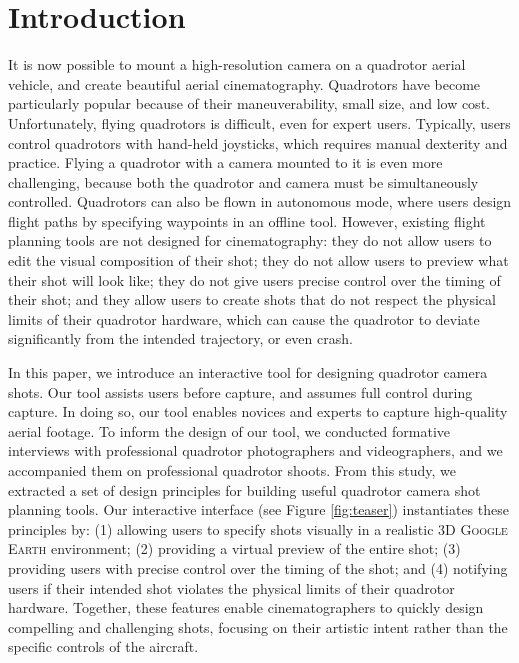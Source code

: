 \section{Introduction}

It is now possible to mount a high-resolution camera on a quadrotor aerial vehicle, and create beautiful aerial cinematography.
Quadrotors have become particularly popular because of their maneuverability, small size, and low cost.
Unfortunately, flying quadrotors is difficult, even for expert users.
Typically, users control quadrotors with hand-held joysticks, which requires manual dexterity and practice.
Flying a quadrotor with a camera mounted to it is even more challenging, because both the quadrotor and camera must be simultaneously controlled. 
Quadrotors can also be flown in autonomous mode, where users design flight paths by specifying waypoints in an offline tool. 
However, existing flight planning tools are not designed for cinematography: they do not allow users to edit the visual composition of their shot; they do not allow users to preview what their shot will look like; they do not give users precise control over the timing of their shot; and they allow users to create shots that do not respect the physical limits of their quadrotor hardware, which can cause the quadrotor to deviate significantly from the intended trajectory, or even crash.

In this paper, we introduce an interactive tool for  designing quadrotor camera shots. Our tool assists users before capture, and assumes full control during capture.
In doing so, our tool enables novices and experts to capture high-quality aerial footage.
To inform the design of our tool, we conducted formative interviews with professional quadrotor photographers and videographers, and we accompanied them on professional quadrotor shoots.
From this study, we extracted a set of design principles for building useful quadrotor camera shot planning tools. 
Our interactive interface (see Figure \ref{fig:teaser}) instantiates these principles by: (1) allowing users to specify shots visually in a realistic 3D \textsc{Google Earth} environment; (2) providing a virtual preview of the entire shot; (3) providing users with precise control over the timing of the shot; and (4) notifying users if their intended shot violates the physical limits of their quadrotor hardware.
Together, these features enable cinematographers to quickly design compelling and challenging shots, focusing on their artistic intent rather than the specific controls of the aircraft. 

